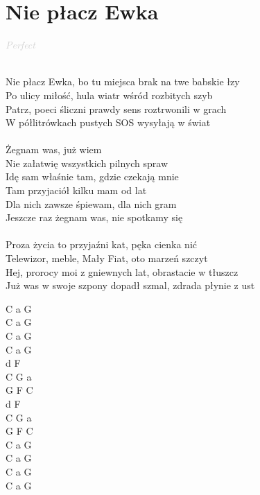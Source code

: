 \documentclass[a5paper, 10pt]{book}
\begin{document}
\section{Nie płacz Ewka}\textcolor{lightgray}{\textit{Perfect}}\\~\\
\begin{minipage}[t]{0.8\textwidth}
Nie płacz Ewka, bo tu miejsca brak na twe babskie łzy\\
Po ulicy miłość, hula wiatr wśród rozbitych szyb\\
Patrz, poeci śliczni prawdy sens roztrwonili w grach\\
W półlitrówkach pustych SOS wysyłają w świat\\
\\
\hspace*{5mm}Żegnam was, już wiem\\
\hspace*{5mm}Nie załatwię wszystkich pilnych spraw\\
\hspace*{5mm}Idę sam właśnie tam, gdzie czekają mnie\\
\hspace*{5mm}Tam przyjaciół kilku mam od lat\\
\hspace*{5mm}Dla nich zawsze śpiewam, dla nich gram\\
\hspace*{5mm}Jeszcze raz żegnam was, nie spotkamy się\\
\\
Proza życia to przyjaźni kat, pęka cienka nić\\
Telewizor, meble, Mały Fiat, oto marzeń szczyt\\
Hej, prorocy moi z gniewnych lat, obrastacie w tłuszcz\\
Już was w swoje szpony dopadł szmal, zdrada płynie z ust\\
\end{minipage}
\begin{minipage}[t]{0.2\textwidth}
C a G\\
C a G\\
C a G\\
C a G\\

d F \\
C G a\\
G F C\\
d F \\
C G a\\
G F C\\

C a G\\
C a G\\
C a G\\
C a G\\
\end{minipage}
\end{document}
